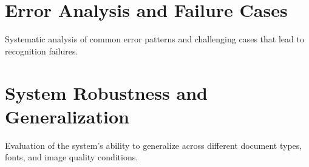 \section{Error Analysis and Failure Cases}
\label{sec:error-analysis}
Systematic analysis of common error patterns and challenging cases that lead to recognition failures.

\section{System Robustness and Generalization}
\label{sec:robustness}
Evaluation of the system's ability to generalize across different document types, fonts, and image quality conditions.
